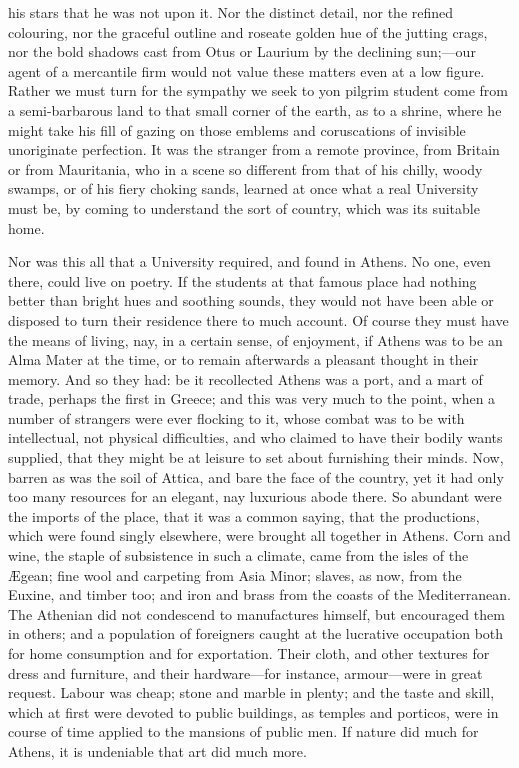 his stars that he was not upon it. Nor the distinct detail, nor the
refined colouring, nor the graceful outline and roseate golden hue of
the jutting crags, nor the bold shadows cast from Otus or Laurium by
the declining sun;—our agent of a mercantile firm would not value
these matters even at a low figure. Rather we must turn for the
sympathy we seek to yon pilgrim student come from a semi-barbarous
land to that small corner of the earth, as to a shrine, where he might
take his fill of gazing on those emblems and coruscations of invisible
unoriginate perfection. It was the stranger from a remote province,
from Britain or from Mauritania, who in a scene so different from that
of his chilly, woody swamps, or of his fiery choking sands, learned at
once what a real University must be, by coming to understand the sort
of country, which was its suitable home.

Nor was this all that a University required, and found in Athens.
No one, even there, could live on poetry. If the students at that
famous place had nothing better than bright hues and soothing sounds,
they would not have been able or disposed to turn their residence
there to much account. Of course they must have the means of
living, nay, in a certain sense, of enjoyment, if Athens was to be an
Alma Mater at the time, or to remain afterwards a pleasant thought in
their memory. And so they had: be it recollected Athens was a port,
and a mart of trade, perhaps the first in Greece; and this was very
much to the point, when a number of strangers were ever flocking to
it, whose combat was to be with intellectual, not physical
difficulties, and who claimed to have their bodily wants supplied,
that they might be at leisure to set about furnishing their minds.
Now, barren as was the soil of Attica, and bare the face of the
country, yet it had only too many resources for an elegant, nay
luxurious abode there. So abundant were the imports of the place, that
it was a common saying, that the productions, which were found singly
elsewhere, were brought all together in Athens. Corn and wine, the
staple of subsistence in such a climate, came from the isles of the
Ægean; fine wool and carpeting from Asia Minor; slaves, as now, from
the Euxine, and timber too; and iron and brass from the coasts of the
Mediterranean. The Athenian did not condescend to manufactures
himself, but encouraged them in others; and a population of foreigners
caught at the lucrative occupation both for home consumption and for
exportation. Their cloth, and other textures for dress and furniture,
and their hardware—for instance, armour—were in great request.
Labour was cheap; stone and marble in plenty; and the taste and skill,
which at first were devoted to public buildings, as temples and
porticos, were in course of time applied to the mansions of public
men. If nature did much for Athens, it is undeniable that art did much
more.

